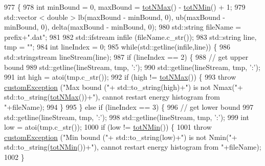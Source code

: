 \begin{DoxyCode}
977                                                               \{
978     \textcolor{keywordtype}{int} minBound = 0, maxBound = \hyperlink{classsim_system_aee2c65ecb43a35c0c4d070cdb45f7dc0}{totNMax}() - \hyperlink{classsim_system_af10842e0eaa638373b8717c87b47e6bc}{totNMin}() + 1;
979     std::vector < double > lb(maxBound - minBound, 0), ub(maxBound - minBound, 0), delta(maxBound - 
      minBound, 0);
980     std::string fileName = prefix+\textcolor{stringliteral}{".dat"};
981 
982     std::ifstream infile (fileName.c\_str());
983     std::string line, tmp = \textcolor{stringliteral}{""};
984     \textcolor{keywordtype}{int} lineIndex = 0;
985     \textcolor{keywordflow}{while}(std::getline(infile,line)) \{
986         std::stringstream lineStream(line);
987         \textcolor{keywordflow}{if} (lineIndex == 2) \{
988             \textcolor{comment}{// get upper bound}
989             std::getline(lineStream, tmp, \textcolor{charliteral}{':'});
990             std::getline(lineStream, tmp, \textcolor{charliteral}{':'});
991             \textcolor{keywordtype}{int} high = atoi(tmp.c\_str());
992             \textcolor{keywordflow}{if} (high != \hyperlink{classsim_system_aee2c65ecb43a35c0c4d070cdb45f7dc0}{totNMax}()) \{
993                 \textcolor{keywordflow}{throw} \hyperlink{classcustom_exception}{customException} (\textcolor{stringliteral}{"Max bound ("}+ std::to\_string(high)+\textcolor{stringliteral}{") is not Nmax("}+
      std::to\_string(\hyperlink{classsim_system_aee2c65ecb43a35c0c4d070cdb45f7dc0}{totNMax}())+\textcolor{stringliteral}{"), cannot restart energy histogram from "}+fileName);
994             \}
995         \} \textcolor{keywordflow}{else} \textcolor{keywordflow}{if} (lineIndex == 3) \{
996             \textcolor{comment}{// get lower bound}
997             std::getline(lineStream, tmp, \textcolor{charliteral}{':'});
998             std::getline(lineStream, tmp, \textcolor{charliteral}{':'});
999             \textcolor{keywordtype}{int} low = atoi(tmp.c\_str());
1000             \textcolor{keywordflow}{if} (low != \hyperlink{classsim_system_af10842e0eaa638373b8717c87b47e6bc}{totNMin}()) \{
1001                 \textcolor{keywordflow}{throw} \hyperlink{classcustom_exception}{customException} (\textcolor{stringliteral}{"Min bound ("}+ std::to\_string(low)+\textcolor{stringliteral}{") is not Nmin("}+
      std::to\_string(\hyperlink{classsim_system_af10842e0eaa638373b8717c87b47e6bc}{totNMin}())+\textcolor{stringliteral}{"), cannot restart energy histogram from "}+fileName);
1002             \}

\end{DoxyCode}
